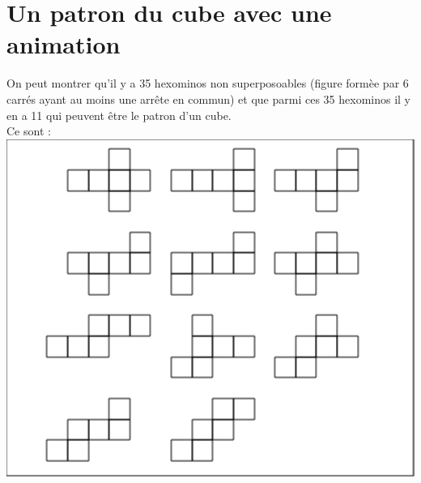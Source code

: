 \documentclass[a4paper,11pt]{book}
\begin{document}
\section{Un patron du cube avec une animation}
On peut montrer qu'il y a 35 hexominos non superposoables (figure form\`ee par 
6 carr\'es ayant au moins une arr\^ete en commun) et que parmi ces 35 hexominos
 il y  en a 11 qui peuvent \^etre le patron d'un cube.\\
Ce sont :\\
\includegraphics[width=\textwidth]{patroncube}\\
\end{document}
